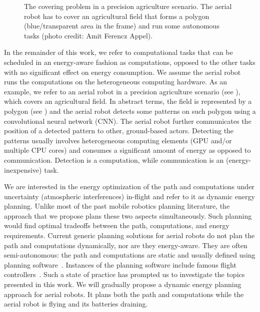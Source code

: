 \begin{figure}[t]
  \centering
  
  \caption[The covering problem in a precision agriculture scenario]{The covering problem in a precision agriculture scenario. The aerial robot has to cover an agricultural field that forms a polygon (blue/transparent area in the frame) and run some autonomous tasks {\scriptsize(photo credit: Amit Ferencz Appel)}.}
  \label{fig:plot2}
\end{figure}

In the remainder of this work, we refer to computational tasks that can be scheduled in an energy-aware fashion as computations, opposed to the other tasks with no significant effect on energy consumption. We assume the aerial robot runs the computations on the heterogeneous computing hardware. As an example, we refer to an aerial robot in a precision agriculture scenario (see ), which covers an agricultural field. In abstract terms, the field is represented by a polygon (see ) and the aerial robot detects some patterns on such polygon using a convolutional neural network (CNN). The aerial robot further communicates the position of a detected pattern to other, ground-based actors. Detecting the patterns usually involves heterogeneous computing elements (GPU and/or multiple CPU cores) and consumes a significant amount of energy as opposed to communication. Detection is a computation, while communication is an (energy-inexpensive) task.

We are interested in the energy optimization of the path and computations under uncertainty (atmospheric interferences) in-flight and refer to it as dynamic energy planning. Unlike most of the past mobile robotics planning literature, the approach that we propose plans these two aspects simultaneously. Such planning would find optimal tradeoffs between the path, computations, and energy requirements. Current generic planning solutions for aerial robots do not plan the path and computations dynamically, nor are they energy-aware. They are often semi-autonomous: the path and computations are static and usually defined using planning software~\citep{daponte2019review}. Instances of the planning software include famous flight controllers~\citep{px4,papa}. Such a state of practice has prompted us to investigate the topics presented in this work. We will gradually propose a dynamic energy planning approach for aerial robots. It plans both the path and computations while the aerial robot is flying and its batteries draining. 

